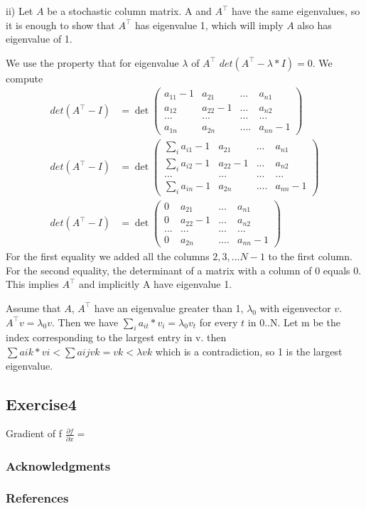 \documentclass{article} %
\begin{document}
ii) Let $A$  be a stochastic column matrix. A and $A^\top$ have the same eigenvalues, so it is enough to show that $A^\top$ has eigenvalue 1, which will imply $A$ also has eigenvalue of 1.

We use the property that for eigenvalue $\lambda$ of $A^\top$
$det(A^\top - \lambda* I) = 0$.
We compute 
\begin{align}
det(A^\top - I) & = \det \begin{pmatrix}
    a_{11} - 1 & a_{21} & ... & a_{n1}\\
    a_{12}    &  a_{22} - 1& ... & a_{n2}\\
    ...& ... & ...& ... \\
    a_{1n} & a_{2n} & ....& a_{nn} - 1
\end{pmatrix}  
\\
det(A^\top - I) & = \det \begin{pmatrix}
    \sum_{i} a_{i1} - 1 & a_{21} & ... & a_{n1}\\
    \sum_{i} a_{i2}  - 1   &  a_{22} - 1& ... & a_{n2}\\
    ...& ... & ...& ... \\
    \sum_{i} a_{in}  - 1& a_{2n} & ....& a_{nn} - 1
   \end{pmatrix}  
 \\
 det(A^\top - I) & = \det \begin{pmatrix}
    0 & a_{21} & ... & a_{n1}\\
    0  &  a_{22} - 1& ... & a_{n2}\\
    ...& ... & ...& ... \\
    0 & a_{2n} & ....& a_{nn} - 1
\end{pmatrix}  
\end{align}
For the first equality we added all the columns $2, 3, ...N-1$ to the first column. For the second equality, the determinant of a matrix with a column of 0 equals 0. This implies $A^\top$ and implicitly A have eigenvalue 1.

Assume that $A$, $A^\top$ have an eigenvalue greater than 1, $\lambda_{0}$ with eigenvector $v$.
$A^\top v = \lambda_{0} v$. Then we have 
$ \sum_{i} a_{it}*v_{i} = \lambda_{0} v_{t}$ for every $t$ in 0..N. Let m be the index corresponding to the largest
entry in v. then $ \sum aik*vi < \sum aij vk = vk <\lambda vk$ 
which is a contradiction, so 1 is the largest eigenvalue.

\subsection{Exercise4}
Gradient of f
$\frac{\partial f}{\partial x} = $

\subsubsection*{Acknowledgments}

\subsubsection*{References}
\end{document}
